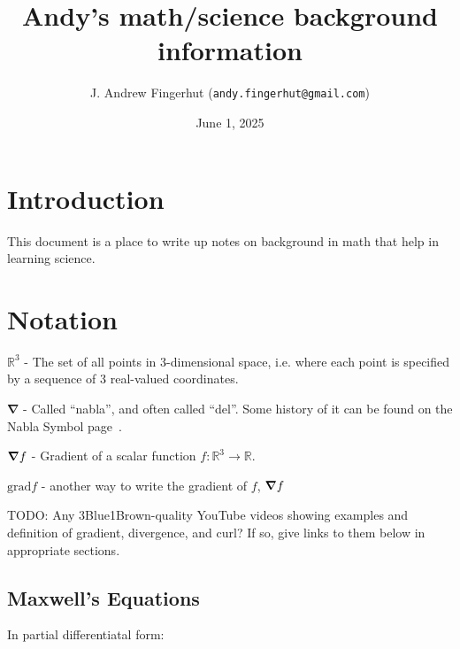 \documentclass[a4paper]{article}
\title{Andy's math/science background information}
\author{J. Andrew Fingerhut (\texttt{andy.fingerhut@gmail.com})}
\date{
        June 1, 2025
}
\theoremstyle{plain}
\theoremstyle{definition}
\newcommand{\reals}{\mathbb{R}}
\newcommand{\del}{\bm{\nabla}}
\begin{document}
\maketitle


\tableofcontents

\section{Introduction}
\label{sec:intro}

This document is a place to write up notes on background in math that
help in learning science.


\section{Notation}
\label{sec:notation}

$\reals^3$ - The set of all points in 3-dimensional space,
i.e. where each point is specified by a sequence of 3 real-valued
coordinates.

$\del$ - Called ``nabla'', and often called ``del''.  Some history of
it can be found on the Nabla Symbol page~\cite{NablaSymbol}.

$\grad f$ - Gradient of a scalar function $f: \reals^3 \rightarrow
\reals$.

$\text{grad} f$ - another way to write the gradient of $f$, $\grad f$

TODO: Any 3Blue1Brown-quality YouTube videos showing examples and
definition of gradient, divergence, and curl?  If so, give links to
them below in appropriate sections.


\subsection{Maxwell's Equations}
\label{sec:maxwellseqns}

In partial differentiatal form:
\end{document}
